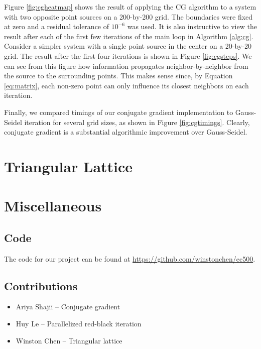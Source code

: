 \documentclass[paper=a4, fontsize=11pt]{scrartcl} %
\numberwithin{equation}{section} %
\numberwithin{figure}{section} %
\numberwithin{table}{section} %
\begin{document}
Figure \ref{fig:cgheatmap} shows the result of applying the CG algorithm to a system with two opposite point sources on a 200-by-200 grid. The boundaries were fixed at zero and a residual tolerance of $10^{-6}$ was used. It is also instructive to view the result after each of the first few iterations of the main loop in Algorithm \ref{alg:cg}. Consider a simpler system with a single point source in the center on a 20-by-20 grid. The result after the first four iterations is shown in Figure \ref{fig:cgsteps}. We can see from this figure how information propagates neighbor-by-neighbor from the source to the surrounding points. This makes sense since, by Equation \ref{eq:matrix}, each non-zero point can only influence its closest neighbors on each iteration.
\linebreak

Finally, we compared timings of our conjugate gradient implementation to Gauss-Seidel iteration for several grid sizes, as shown in Figure \ref{fig:cgtimings}. Clearly, conjugate gradient is a substantial algorithmic improvement over Gauss-Seidel.

\section{Triangular Lattice}


\section{Miscellaneous}
\subsection{Code}
The code for our project can be found at \url{https://github.com/winstonchen/ec500}.

\subsection{Contributions}
\begin{itemize}
	\item Ariya Shajii -- Conjugate gradient
	\item Huy Le -- Parallelized red-black iteration
	\item Winston Chen -- Triangular lattice
\end{itemize}
\end{document}
